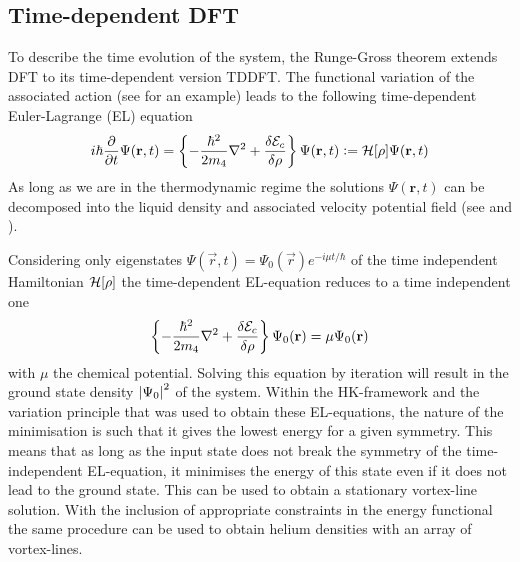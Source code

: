 	\subsection{Time-dependent DFT}\label{sec:tddft}
	To describe the time evolution of the system, the Runge-Gross theorem extends DFT to its time-dependent version TDDFT\citep{Run84}. The functional variation of the associated action (see  for an example) leads to the following time-dependent Euler-Lagrange (EL) equation 
	\begin{align}
		i\hbar\frac{\partial}{\partial t} \Psi(\vec{r},t) = \left\{-\frac{\hbar^2}{2m_4}\laplacian + \fdv{\mathcal{E}_c}{\rho}\right\}\Psi(\vec{r},t) \vcentcolon= \mathcal{H}\qty[\rho]\Psi(\vec{r},t) 
		\label{eq:td-el-equation}
	\end{align}
	As long as we are in the thermodynamic regime the solutions $\Psi(\textbf{r},t)$ can be decomposed into the liquid density and associated velocity potential field (see  and ).
	
	Considering only eigenstates $\Psi(\vec{r},t)=\Psi_0(\vec{r})\unit{e}^{-i\mu t/\hbar}$ of the time independent Hamiltonian $\mathcal{H}\qty[\rho]$ the time-dependent EL-equation reduces to a time independent one
	\begin{align}
		\left\{-\frac{\hbar^2}{2m_4} \laplacian + \fdv{\mathcal{E}_c}{\rho}\right\}\Psi_0(\textbf{r}) = \mu\Psi_0(\textbf{r})
		\label{eq:el-equation}
	\end{align}
	with $\mu$ the chemical potential. Solving this equation by iteration will result in the ground state density $\abs{\Psi_0}^2$ of the system. Within the HK-framework and the variation principle that was used to obtain these EL-equations, the nature of the minimisation is such that it gives the lowest energy for a given symmetry. This means that as long as the input state does not break the symmetry of the time-independent EL-equation, it minimises the energy of this state even if it does not lead to the ground state. This can be used to obtain a stationary vortex-line solution. With the inclusion of appropriate constraints in the energy functional the same procedure can be used to obtain helium densities with an array of vortex-lines.

